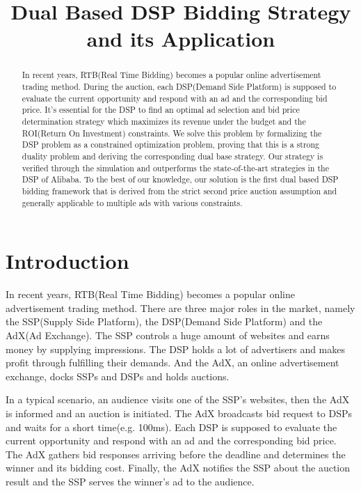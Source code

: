 \documentclass{article}
\title{Dual Based DSP Bidding Strategy and its Application}
\begin{document}
\maketitle

\begin{abstract}
In recent years, RTB(Real Time Bidding) becomes a popular online advertisement trading method.
During the auction, each DSP(Demand Side Platform) is supposed to
    evaluate the current opportunity and respond with an ad and the corresponding bid price.
It's essential for the DSP to find an optimal ad selection and bid price determination strategy
    which maximizes its revenue under the budget and the ROI(Return On Investment) constraints.
We solve this problem by
    formalizing the DSP problem as a constrained optimization problem,
    proving that this is a strong duality problem and deriving the corresponding dual base strategy.
Our strategy is verified through the simulation and outperforms the state-of-the-art strategies in the DSP of Alibaba.
To the best of our knowledge, our solution is the first dual based DSP bidding framework
    that is derived from the strict second price auction assumption and
    generally applicable to multiple ads with various constraints.
\end{abstract}


\section{Introduction} \label{Introduction}

In recent years, RTB(Real Time Bidding) becomes a popular online advertisement trading method.
There are three major roles in the market, namely the SSP(Supply Side Platform), the DSP(Demand Side Platform) and the AdX(Ad Exchange).
The SSP controls a huge amount of websites and earns money by supplying impressions.
The DSP holds a lot of advertisers and makes profit through fulfilling their demands.
And the AdX, an online advertisement exchange, docks SSPs and DSPs and holds auctions.

In a typical scenario, an audience visits one of the SSP's websites, then the AdX is informed and an auction is initiated.
The AdX broadcasts bid request to DSPs and waits for a short time(e.g. 100ms).
Each DSP is supposed to evaluate the current opportunity and respond with an ad and the corresponding bid price.
The AdX gathers bid responses arriving before the deadline and determines the winner and its bidding cost.
Finally, the AdX notifies the SSP about the auction result and the SSP serves the winner's ad to the audience.
\end{document}
